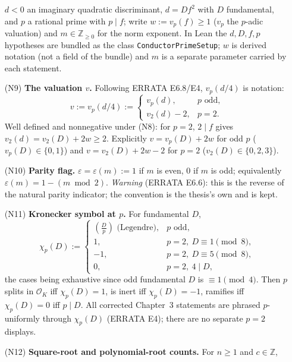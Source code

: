 \begin{definition}
\begin{enumerate}
      $d < 0$ an imaginary quadratic discriminant, $d = Df^2$ with $D$ fundamental, and
      $p$ a rational prime with $p \mid f$; write $w := v_p(f) \geq 1$ ($v_p$ the
      $p$-adic valuation) and $m \in \mathbb{Z}_{\geq 0}$ for the norm exponent. In Lean
      the $d, D, f, p$ hypotheses are bundled as the class
      \texttt{ConductorPrimeSetup}; $w$ is derived notation (not a field of the bundle)
      and $m$ is a separate parameter carried by each statement.
    \item[(N9)] \textbf{The valuation $v$.} Following ERRATA E6.8/E4, $v_p(d/4)$ is
      notation:
      \[
        v := v_p(d/4) :=
        \begin{cases}
          v_p(d), & p \text{ odd},\\
          v_2(d) - 2, & p = 2.
        \end{cases}
      \]
      Well defined and nonnegative under (N8): for $p = 2$, $2 \mid f$ gives
      $v_2(d) = v_2(D) + 2w \geq 2$. Explicitly $v = v_p(D) + 2w$ for odd $p$
      ($v_p(D) \in \{0,1\}$) and $v = v_2(D) + 2w - 2$ for $p = 2$
      ($v_2(D) \in \{0,2,3\}$).
    \item[(N10)] \textbf{Parity flag.} $\varepsilon = \varepsilon(m) := 1$ if $m$ is even,
      $0$ if $m$ is odd; equivalently $\varepsilon(m) = 1 - (m \bmod 2)$.
      \emph{Warning} (ERRATA E6.6): this is the reverse of the natural parity indicator;
      the convention is the thesis's own and is kept.
    \item[(N11)] \textbf{Kronecker symbol at $p$.} For fundamental $D$,
      \[
        \chi_p(D) :=
        \begin{cases}
          \left(\frac{D}{p}\right) \text{ (Legendre)}, & p \text{ odd},\\
          1, & p = 2,\ D \equiv 1 \pmod 8,\\
          -1, & p = 2,\ D \equiv 5 \pmod 8,\\
          0, & p = 2,\ 4 \mid D,
        \end{cases}
      \]
      the cases being exhaustive since odd fundamental $D$ is $\equiv 1 \pmod 4$. Then
      $p$ splits in $\mathcal{O}_K$ iff $\chi_p(D) = 1$, is inert iff $\chi_p(D) = -1$,
      ramifies iff $\chi_p(D) = 0$ iff $p \mid D$. All corrected Chapter~3 statements are
      phrased $p$-uniformly through $\chi_p(D)$ (ERRATA E4); there are no separate
      $p = 2$ displays.
    \item[(N12)] \textbf{Square-root and polynomial-root counts.} For $n \geq 1$ and
      $c \in \mathbb{Z}$,

\end{enumerate}
\end{definition}
